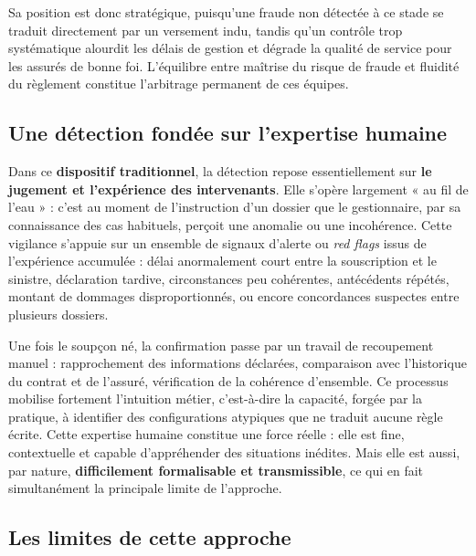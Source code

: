 Sa position est donc stratégique, puisqu'une fraude non détectée à ce stade se traduit directement par un versement indu, tandis qu'un contrôle trop systématique alourdit les délais de gestion et dégrade la qualité de service pour les assurés de bonne foi. L'équilibre entre maîtrise du risque de fraude et fluidité du règlement constitue l'arbitrage permanent de ces équipes.

\subsection{Une détection fondée sur l'expertise humaine}

Dans ce \textbf{dispositif traditionnel}, la détection repose essentiellement sur \textbf{le jugement et l'expérience des intervenants}. Elle s'opère largement « au fil de l'eau » : c'est au moment de l'instruction d'un dossier que le gestionnaire, par sa connaissance des cas habituels, perçoit une anomalie ou une incohérence. Cette vigilance s'appuie sur un ensemble de signaux d'alerte ou \textit{red flags} issus de l'expérience accumulée : délai anormalement court entre la souscription et le sinistre, déclaration tardive, circonstances peu cohérentes, antécédents répétés, montant de dommages disproportionnés, ou encore concordances suspectes entre plusieurs dossiers.

Une fois le soupçon né, la confirmation passe par un travail de recoupement manuel : rapprochement des informations déclarées, comparaison avec l'historique du contrat et de l'assuré, vérification de la cohérence d'ensemble. Ce processus mobilise fortement l'intuition métier, c'est-à-dire la capacité, forgée par la pratique, à identifier des configurations atypiques que ne traduit aucune règle écrite. Cette expertise humaine constitue une force réelle : elle est fine, contextuelle et capable d'appréhender des situations inédites. Mais elle est aussi, par nature, \textbf{difficilement formalisable et transmissible}, ce qui en fait simultanément la principale limite de l'approche.

\subsection{Les limites de cette approche}

